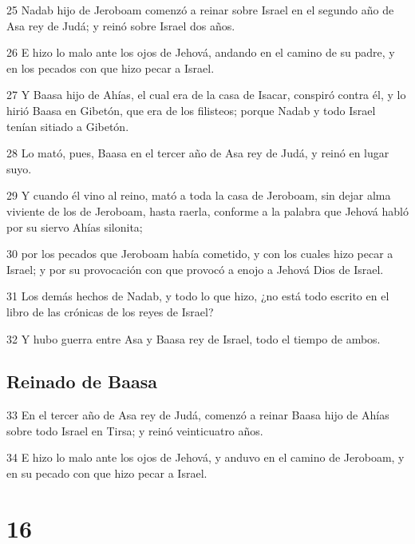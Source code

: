 \par 25 Nadab hijo de Jeroboam comenzó a reinar sobre Israel en el segundo año de Asa rey de Judá; y reinó sobre Israel dos años.
\par 26 E hizo lo malo ante los ojos de Jehová, andando en el camino de su padre, y en los pecados con que hizo pecar a Israel.
\par 27 Y Baasa hijo de Ahías, el cual era de la casa de Isacar, conspiró contra él, y lo hirió Baasa en Gibetón, que era de los filisteos; porque Nadab y todo Israel tenían sitiado a Gibetón.
\par 28 Lo mató, pues, Baasa en el tercer año de Asa rey de Judá, y reinó en lugar suyo.
\par 29 Y cuando él vino al reino, mató a toda la casa de Jeroboam, sin dejar alma viviente de los de Jeroboam, hasta raerla, conforme a la palabra que Jehová habló por su siervo Ahías silonita; 
\par 30 por los pecados que Jeroboam había cometido, y con los cuales hizo pecar a Israel; y por su provocación con que provocó a enojo a Jehová Dios de Israel.
\par 31 Los demás hechos de Nadab, y todo lo que hizo, ¿no está todo escrito en el libro de las crónicas de los reyes de Israel?
\par 32 Y hubo guerra entre Asa y Baasa rey de Israel, todo el tiempo de ambos.

\section*{Reinado de Baasa}

\par 33 En el tercer año de Asa rey de Judá, comenzó a reinar Baasa hijo de Ahías sobre todo Israel en Tirsa; y reinó veinticuatro años.
\par 34 E hizo lo malo ante los ojos de Jehová, y anduvo en el camino de Jeroboam, y en su pecado con que hizo pecar a Israel.

\chapter{16}

